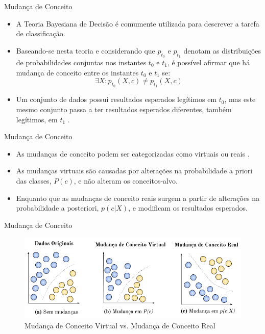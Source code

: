 \documentclass[10pt]{beamer}
\begin{document}
\begin{frame}{Mudança de Conceito}
    \begin{itemize}
        \item<1 -> A Teoria Bayesiana de Decisão \cite{Duda:2000:PC:954544} é comumente utilizada para descrever a tarefa de classificação.
        \item<2 -> Baseando-se nesta teoria e considerando que $p_{t_0}$ e $p_{t_1}$ denotam as distribuições de probabilidades conjuntas nos instantes $t_0$ e $t_1$, é possível afirmar que há mudança de conceito entre os instantes $t_0$ e $t_1$ se:
        \begin{equation} \label{eq:3}
            {\exists}X : p_{t_0}(X, c) \ne p_{t_1}(X, c)
        \end{equation}
        \item<3 -> Um conjunto de dados possui resultados esperados legítimos em $t_0$, mas este mesmo conjunto passa a ter resultados esperados diferentes, também legítimos, em $t_1$ \cite{Kolter:2007:DWM:1314498.1390333}.
    \end{itemize}
\end{frame}

\begin{frame}{Mudança de Conceito}
    \begin{itemize}
        \item<1 -> As mudanças de conceito podem ser categorizadas como virtuais ou reais \cite{Gama:2014:SCD:2597757.2523813}.
        \item<2 -> As mudanças virtuais são causadas por alterações na probabilidade a priori das classes, $P(c)$, e não alteram os conceitos-alvo.
        \item<3 -> Enquanto que as mudanças de conceito reais surgem a partir de alterações na probabilidade a posteriori, $p(c|X)$, e modificam os resultados esperados.
    \end{itemize}
\end{frame}

\begin{frame}{Mudança de Conceito}
\begin{figure}[H]
    \begin{center}
        \includegraphics[scale=0.5]{../text/imagens/concept_drift.png}
        \caption{Mudança de Conceito Virtual vs. Mudança de Conceito Real}
        \label{fig:real_and_virtual_concept_drift}
    \end{center}
\end{figure}
\end{frame}
\end{document}
